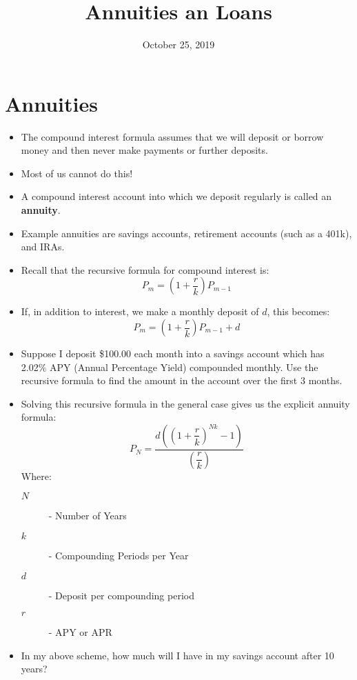 \documentclass{article}
\title{Annuities an Loans}
\date{October 25, 2019}
\begin{document}
\maketitle

\section{Annuities}
\begin{itemize}
    \item The compound interest formula assumes that we will deposit
        or borrow money and then never make payments or further deposits.
    \item Most of us cannot do this!
    \item A compound interest account into which we deposit regularly
        is called an \textbf{annuity}.
    \item Example annuities are savings accounts, retirement accounts
        (such as a 401k), and IRAs.
    \item Recall that the recursive formula for compound interest is:
        \[
            P_m = \left(1+\dfrac{r}{k}\right) P_{m-1}
        \]
    \item If, in addition to interest, we make a monthly deposit of
        $d$, this becomes:
        \[
            P_m = \left(1+\dfrac{r}{k}\right) P_{m-1} + d
        \]
    \item Suppose I deposit \$100.00 each month into a savings account
        which has 2.02\% APY (Annual Percentage Yield) compounded
        monthly.  Use the recursive formula to find the amount in the
        account over the first 3 months.
    \item Solving this recursive formula in the general case gives us
        the explicit annuity formula:
        \[
            P_N = \dfrac{d\left(\left(1+\dfrac{r}{k}\right)^{Nk} - 1 \right)}%
                        {\left(\dfrac{r}{k}\right)}
        \]
        Where:
        \begin{description}
            \item[$N$] - Number of Years
            \item[$k$] - Compounding Periods per Year
            \item[$d$] - Deposit per compounding period
            \item[$r$] - APY or APR
        \end{description}

    \item In my above scheme, how much will I have in my savings
        account after 10 years?
\end{itemize}
\end{document}

